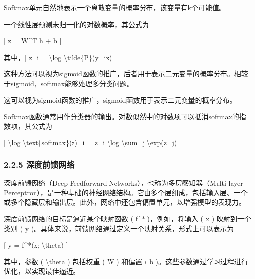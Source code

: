 Softmax单元自然地表示一个离散变量的概率分布，该变量有k个可能值。

一个线性层预测未归一化的对数概率，其公式为

{[} z = W\^{}T h + b {]}

其中，{[} z\_i = \textbackslash log
\textbackslash tilde\{P\}(y=i\textbar x) {]}


这种方法可以视为sigmoid函数的推广，后者用于表示二元变量的概率分布。相较于sigmoid，softmax能够处理多分类问题。

这可以视为sigmoid函数的推广，sigmoid函数用于表示二元变量的概率分布。

Softmax函数通常用作分类器的输出。对数似然中的对数项可以抵消softmax的指数项，其公式为

{[} \textbackslash log \textbackslash text\{softmax\}(z)\_i = z\_i
\textbackslash log \textbackslash sum\_j \textbackslash exp(z\_j) {]}


\subsubsection{\texorpdfstring{\textbf{2.2.5}
\textbf{深度前馈网络}}{2.2.5 深度前馈网络}}\label{225-ux6df1ux5ea6ux524dux9988ux7f51ux7edc}

深度前馈网络（Deep Feedforward Networks），也称为多层感知器（Multi-layer
Perceptron），是一种基础的神经网络结构。它由多个层组成，包括输入层、一个或多个隐藏层和输出层。此外，网络中还包含偏置单元，以增强模型的表现力。

深度前馈网络的目标是逼近某个映射函数 ( f\^{}* )，例如，将输入 ( x )
映射到一个类别 ( y
)。具体来说，前馈网络通过定义一个映射关系，形式上可以表示为

{[} y = f\^{}*(x; \textbackslash theta) {]}


其中，参数 ( \textbackslash theta ) 包括权重 ( W ) 和偏置 ( b
)。这些参数通过学习过程进行优化，以实现最佳逼近。


